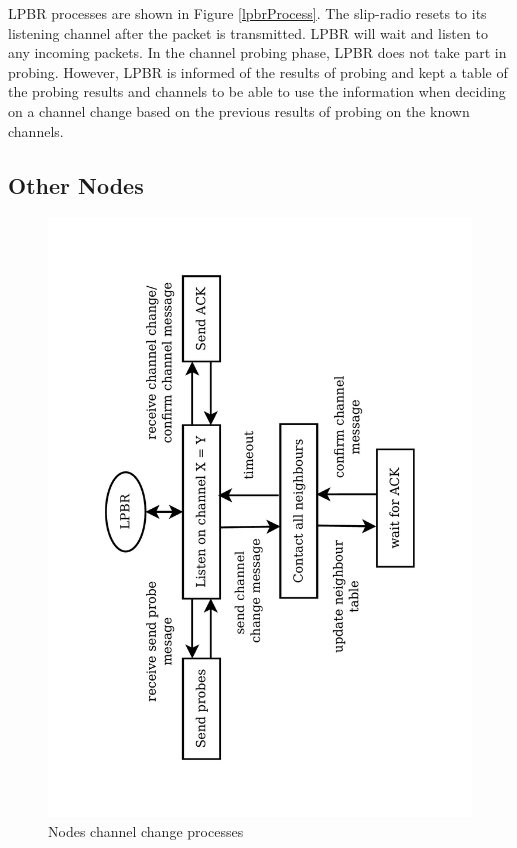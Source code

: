LPBR processes are shown in Figure \ref{lpbrProcess}.
The slip-radio resets to its listening channel after the packet is transmitted. LPBR will wait and listen to any incoming packets. In the channel probing phase, LPBR does not take part in probing. However, LPBR is informed of the results of probing and kept a table of the probing results and channels to be able to use the information when deciding on a channel change based on the previous results of probing on the known channels.



\subsection{Other Nodes}

\begin{figure}
\centering
\includegraphics[trim=2cm 2cm 2.5cm 2cm, clip=true, totalheight=0.58\textheight, angle=270]{otherNodes.pdf}
\caption{Nodes channel change processes}
\label{fig_otherNodes}
\end{figure}

